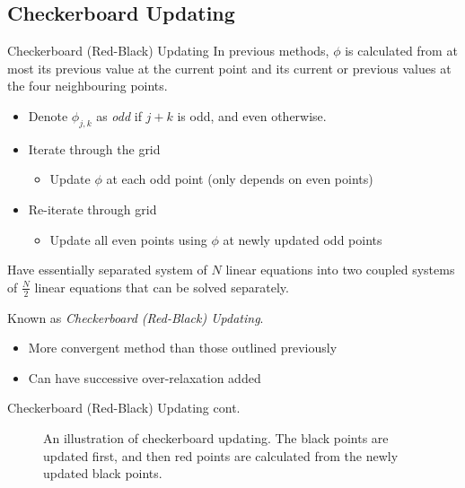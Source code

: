 \documentclass{beamer}
\begin{document}
\subsection{Checkerboard Updating}
\begin{frame}{Checkerboard (Red-Black) Updating}
In previous methods, $\phi$ is calculated from at most its previous value at the
current point and its current or previous values at the four neighbouring points.
\begin{itemize}
\item Denote $\phi_{j,k}$ as \emph{odd} if $j+k$ is odd, and even otherwise.
\item Iterate through the grid
 \begin{itemize}
 \item Update $\phi$ at each odd point (only depends on even points)
 \end{itemize}
\item Re-iterate through grid
 \begin{itemize}
 \item Update all even points using $\phi$ at newly updated odd points
 \end{itemize}
\end{itemize}

Have essentially separated system of $N$ linear equations into two coupled systems
of $\frac{N}{2}$ linear equations that can be solved separately.

Known as \emph{Checkerboard (Red-Black) Updating}.

\begin{itemize}
\item More convergent method than those outlined previously
\item Can have successive over-relaxation added
\end{itemize}

\end{frame}

\begin{frame}{Checkerboard (Red-Black) Updating cont.}
\begin{figure}[h!]
\begin{center}
\end{center}
\caption{An illustration of checkerboard updating. The black points are updated first,
and then red points are calculated from the newly updated black points.}
\label{fig:checker}
\end{figure}

\end{frame}
\end{document}
